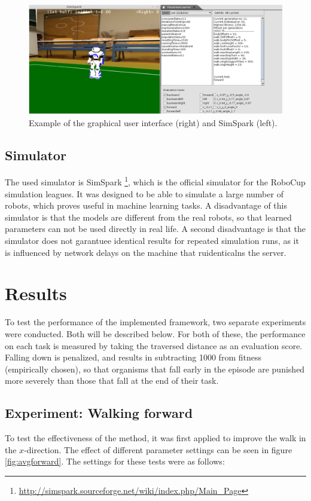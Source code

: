 \documentclass{article}
\begin{document}
\begin{figure}[h!]
	\center
	\includegraphics[width=\textwidth]{images/GUI}
	\caption{Example of the graphical user interface (right) and SimSpark (left).}
	\label{fig:gui}
\end{figure}

\subsection{Simulator}
The used simulator is SimSpark \footnote{\url{http://simspark.sourceforge.net/wiki/index.php/Main_Page}}, which is the official simulator for the RoboCup simulation leagues. It was designed to be able to simulate a large number of robots, which proves useful in machine learning tasks. A disadvantage of this simulator is that the models are 
different from the real robots, so that learned parameters can not be used
directly in real life. A second disadvantage is that the simulator does not
garantuee identical results for repeated simulation runs, as it is influenced
by network delays on the machine that ruidenticalns the server. 

\section{Results}
To test the performance of the implemented framework, two separate experiments were conducted. Both will be described below. For both of these, the performance on each task is measured by taking the traversed distance as an evaluation score. Falling down is penalized, and results in subtracting 1000 from fitness (empirically chosen), so that organisms that fall early in the episode are punished more severely than those that fall at the end of their task.

\subsection{Experiment: Walking forward}
To test the effectiveness of the method, it was first applied to improve the walk in the $x$-direction. The effect of different parameter settings can be seen in figure \ref{fig:avgforward}. The settings for these tests were as follows:
\end{document}
